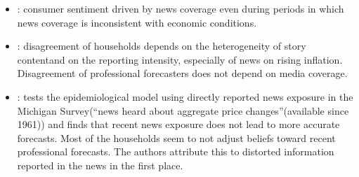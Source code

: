 \begin{itemize}
	\item \cite{doms2004consumer}:  consumer sentiment driven by news coverage even during periods in which news coverage is inconsistent with economic conditions.
	\item \href{https://github.com/iworld1991/EpiExp/blob/master/Literature/lamla2012role.pdf}{\cite{lamla2012role}}: disagreement of households depends on the heterogeneity of story contentand on the reporting intensity, especially of news on rising inﬂation. Disagreement of professional forecasters does not depend on media coverage. %
	\item \href{https://github.com/iworld1991/EpiExp/blob/master/Literature/pfajfar_news_2013.pdf}{\cite{pfajfar_news_2013}}: tests the epidemiological model using directly reported news exposure in the Michigan Survey(``news heard about aggregate price changes''(available since 1961)) and finds that recent news exposure does not lead to more accurate forecasts. Most of the households seem to not adjust beliefs toward recent professional forecasts. The authors attribute this to distorted information reported in the news in the first place.    %


\end{itemize}
